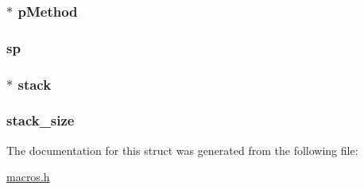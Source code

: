 \subsubsection[{p\+Method}]{$\ast$ p\+Method}\label{struct_frame_a2a145c2f4c0f3bcf0dfdc1f1e3b3861b}
\hypertarget{struct_frame_a16c9e46e653a3c2df6e0809e094d5fe9}{}
\subsubsection[{sp}]{ sp}\label{struct_frame_a16c9e46e653a3c2df6e0809e094d5fe9}
\hypertarget{struct_frame_a7ca4d10dfc7be9e5143b39f0d85df4ed}{}
\subsubsection[{stack}]{$\ast$ stack}\label{struct_frame_a7ca4d10dfc7be9e5143b39f0d85df4ed}
\hypertarget{struct_frame_a9084483c0055ef44e3edca4da4910f97}{}
\subsubsection[{stack\+\_\+size}]{ stack\+\_\+size}\label{struct_frame_a9084483c0055ef44e3edca4da4910f97}


The documentation for this struct was generated from the following file\+:\begin{DoxyCompactItemize}
\item 
\hyperlink{macros_8h}{macros.\+h}\end{DoxyCompactItemize}
